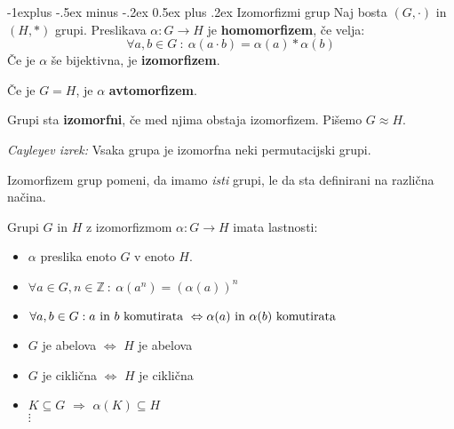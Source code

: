 \documentclass[a4paper,9pt]{extarticle}
\makeatletter
\renewcommand{\subsection}{\@startsection{subsection}{2}{0mm}%
                                {-1explus -.5ex minus -.2ex}%
                                {0.5ex plus .2ex}%
                                {\normalfont\normalsize\bfseries}}
\makeatother
\begin{document}
\begin{multicols}{3}
\subsection{Izomorfizmi grup}
Naj bosta $(G, \cdot )$ in $(H, *)$ grupi. Preslikava $\alpha : G \to H$ je \textbf{homomorfizem}, če velja:
\[ \forall a, b  \in G\ :\ \alpha(a \cdot b) = \alpha(a) * \alpha(b) \]
Če je $\alpha$ še bijektivna, je \textbf{izomorfizem}.

Če je $G = H$, je $\alpha$ \textbf{avtomorfizem}.

Grupi sta \textbf{izomorfni}, če med njima obstaja izomorfizem. Pišemo $G \approx H$.

\emph{Cayleyev izrek:} Vsaka grupa je izomorfna neki permutacijski grupi.

Izomorfizem grup pomeni, da imamo \emph{isti} grupi, le da sta definirani na različna načina.

Grupi $G$ in $H$ z izomorfizmom $\alpha: G \to H$ imata lastnosti:
\begin{itemize}
    \item $\alpha$ preslika enoto $G$ v enoto $H$.
    \item $\forall a \in G, n \in \mathbb{Z}\ :\ \alpha(a^n) = \left( \alpha(a) \right)^n$
    \item $\forall a,b \in G : a \textmd{ in } b \textmd{ komutirata } \Leftrightarrow \alpha(a) \textmd{ in } \alpha(b) \textmd{ komutirata }$
    \item $G$ je abelova $\Leftrightarrow$ $H$ je abelova
    \item $G$ je ciklična $\Leftrightarrow$ $H$ je ciklična
    \item $K \subseteq G$ $\Rightarrow$ $\alpha(K) \subseteq H$\\
    $\vdots$
\end{itemize}



\end{multicols}
\end{document}
